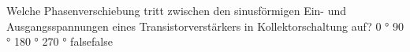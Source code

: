     {Welche Phasenverschiebung tritt zwischen den sinusförmigen Ein- und Ausgangsspannungen eines Transistorverstärkers in Kollektorschaltung auf?}
    {0 °}
    {90 °}
    {180 °}
    {270 °}
    {false}{false}